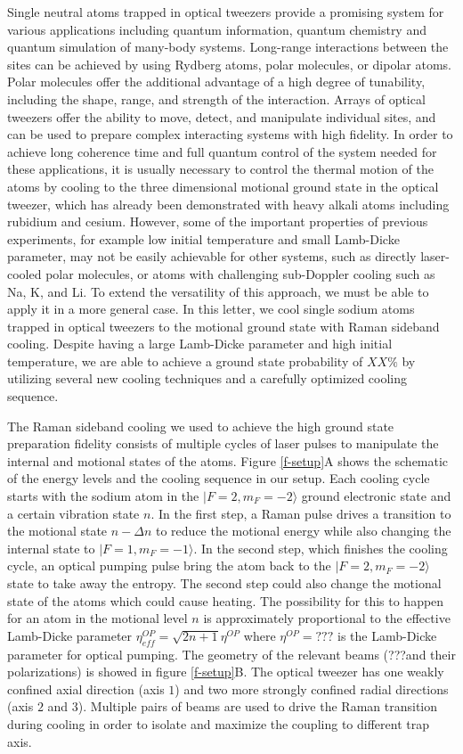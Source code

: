 \documentclass[aps,prl,twocolumn,groupedaddress]{revtex4-1}
\begin{document}
Single neutral atoms trapped in optical tweezers provide a promising system
for various applications including quantum information, quantum chemistry
and quantum simulation of many-body systems.
Long-range interactions between the sites can be achieved by using Rydberg atoms,
polar molecules, or dipolar atoms.
Polar molecules offer the additional advantage of a high degree of tunability,
including the shape, range, and strength of the interaction.
Arrays of optical tweezers offer the ability to move, detect, and manipulate individual sites,
and can be used to prepare complex interacting systems with high fidelity.
In order to achieve long coherence time and full quantum control of the system needed for
these applications,
it is usually necessary to control the thermal motion of the atoms by cooling to the
three dimensional motional ground state in the optical tweezer,
which has already been demonstrated with heavy alkali atoms including rubidium and cesium.
However, some of the important properties of previous experiments,
for example low initial temperature and small Lamb-Dicke parameter,
may not be easily achievable for other systems, such as directly laser-cooled polar molecules,
or atoms with challenging sub-Doppler cooling such as Na, K, and Li.
To extend the versatility of this approach, we must be able to apply it in a more general case.
In this letter, we cool single sodium atoms
trapped in optical tweezers to the motional ground state with Raman sideband cooling.
Despite having a large Lamb-Dicke parameter and high initial temperature, we are able to achieve a ground state probability of $XX\%$
by utilizing several new cooling techniques and a carefully optimized cooling sequence.

The Raman sideband cooling we used to achieve the high ground state preparation fidelity
consists of multiple cycles of laser pulses to manipulate the internal and
motional states of the atoms.
Figure \ref{f-setup}A shows the schematic of the energy levels and the cooling sequence
in our setup.
Each cooling cycle starts with the sodium atom in the $|F=2, m_F=-2\rangle$
ground electronic state and a certain vibration state $n$.
In the first step, a Raman pulse drives a transition to the motional state $n-\Delta n$
to reduce the motional energy while also changing the internal state to $|F=1, m_F=-1\rangle$.
In the second step, which finishes the cooling cycle,
an optical pumping pulse bring the atom back to the $|F=2, m_F=-2\rangle$ state to take away
the entropy. The second step could also change the motional state of the atoms which
could cause heating. The possibility for this to happen for an atom in the motional level $n$
is approximately proportional to the effective Lamb-Dicke parameter
$\eta^{OP}_{eff}=\sqrt{2n+1}\eta^{OP}$ where $\eta^{OP}=???$ is the Lamb-Dicke parameter for
optical pumping.
The geometry of the relevant beams (???and their polarizations) is showed in figure \ref{f-setup}B.
The optical tweezer has one weakly confined axial direction (axis $1$) and
two more strongly confined radial directions (axis $2$ and $3$).
Multiple pairs of beams are used to drive the Raman transition during cooling in order to
isolate and maximize the coupling to different trap axis.
\end{document}

